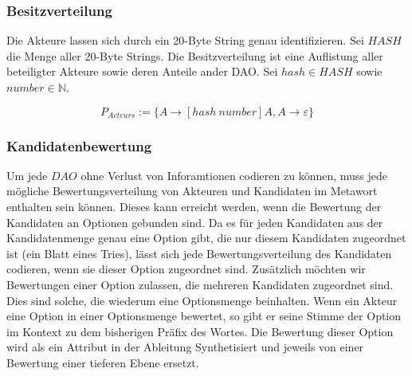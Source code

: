 \documentclass[a4paper,12pt]{report}
\begin{document}
% 
% 
% 
% 


\subsubsection*{Besitzverteilung}
Die Akteure lassen sich durch ein 20-Byte String genau identifizieren. Sei $HASH$ die Menge aller 20-Byte Strings. Die Besitzverteilung ist eine Auflistung aller beteiligter Akteure sowie deren Anteile ander DAO.
Sei $hash\in HASH$ sowie $number\in\mathbb{N}$.

\[ P_{Acteurs} := \{A\rightarrow[hash\ number]A,A\rightarrow \varepsilon\} \] 


\subsubsection*{Kandidatenbewertung}
Um jede $DAO$ ohne Verlust von Inforamtionen codieren zu können, muss jede mögliche Bewertungsverteilung von Akteuren und Kandidaten im Metawort enthalten sein können. 
Dieses kann erreicht werden, wenn die Bewertung der Kandidaten an Optionen gebunden sind. Da es für jeden Kandidaten aus der Kandidatenmenge genau eine Option gibt, die nur diesem Kandidaten zugeordnet ist (ein Blatt eines Tries), lässt sich jede Bewertungsverteilung des Kandidaten codieren, wenn sie dieser Option zugeordnet sind. Zusätzlich möchten wir Bewertungen einer Option zulassen, die mehreren Kandidaten zugeordnet sind. Dies sind solche, die wiederum eine Optionsmenge beinhalten. Wenn ein Akteur eine Option in einer Optionsmenge bewertet, so gibt er seine Stimme der Option im Kontext zu dem bisherigen Präfix des Wortes.
Die Bewertung dieser Option wird als ein Attribut in der Ableitung Synthetisiert\cite{Knuth1968} und jeweils von einer Bewertung einer tieferen Ebene ersetzt.
\end{document}
